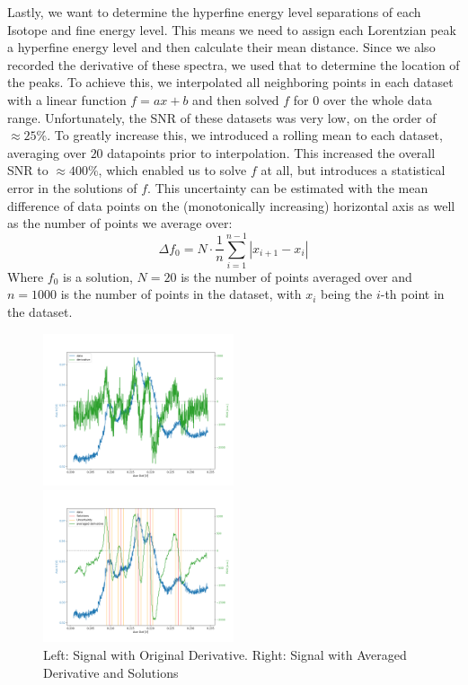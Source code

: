 \documentclass[12pt, a4paper]{article}
\begin{document}
Lastly, we want to determine the hyperfine energy level separations of each Isotope and fine energy level. This means we need to assign each Lorentzian peak a hyperfine energy level and then calculate their mean distance. Since we also recorded the derivative of these spectra, we used that to determine the location of the peaks. To achieve this, we interpolated all neighboring points in each dataset with a linear function $f = ax + b$ and then solved $f$ for $0$ over the whole data range. Unfortunately, the SNR of these datasets was very low, on the order of $\approx 25\%$. To greatly increase this, we introduced a rolling mean to each dataset, averaging over $20$ datapoints prior to interpolation. This increased the overall SNR to $\approx 400\%$, which enabled us to solve $f$ at all, but introduces a statistical error in the solutions of $f$. This uncertainty can be estimated with the mean difference of data points on the (monotonically increasing) horizontal axis as well as the number of points we average over:
\begin{equation}
\Delta f_0 = N \cdot \frac{1}{n} \sum_{i = 1}^{n - 1} \left\lvert x_{i + 1} - x_i \right\rvert
\label{interpolationuncertainty}
\end{equation}
Where $f_0$ is a solution, $N = 20$ is the number of points averaged over and $n = 1000$ is the number of points in the dataset, with $x_i$ being the $i$-th point in the dataset.

\begin{figure}
    \centering
    \parbox{0.45\textwidth}{
        \includegraphics[width=0.5\textwidth]{originalderivative.png}
    }
    \hfill
    \parbox{0.45\textwidth}{
        \includegraphics[width=0.5\textwidth]{averagedderivative.png}
    }
    \caption{Left: Signal with Original Derivative. Right: Signal with Averaged Derivative and Solutions}
    \label{lorentzianprofile}
\end{figure}
\end{document}
